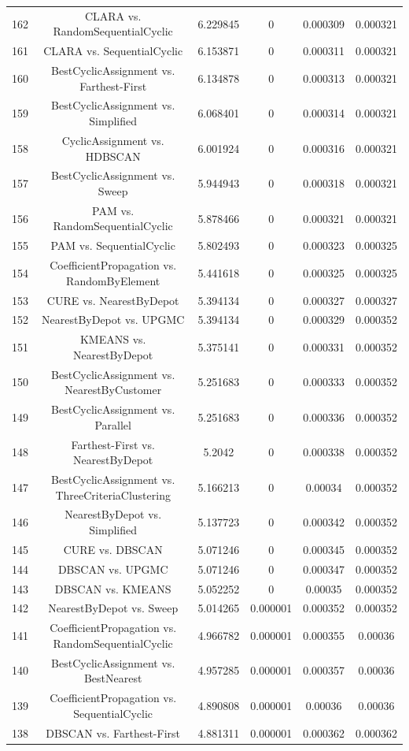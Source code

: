 \documentclass[a4paper,10pt]{article}
\begin{document}
\begin{landscape}
\begin{table}[!htp]
\begin{tabular}{cccccc}
162&CLARA vs. RandomSequentialCyclic&6.229845&0&0.000309&0.000321\\
161&CLARA vs. SequentialCyclic&6.153871&0&0.000311&0.000321\\
160&BestCyclicAssignment vs. Farthest-First&6.134878&0&0.000313&0.000321\\
159&BestCyclicAssignment vs. Simplified&6.068401&0&0.000314&0.000321\\
158&CyclicAssignment vs. HDBSCAN&6.001924&0&0.000316&0.000321\\
157&BestCyclicAssignment vs. Sweep&5.944943&0&0.000318&0.000321\\
156&PAM vs. RandomSequentialCyclic&5.878466&0&0.000321&0.000321\\
155&PAM vs. SequentialCyclic&5.802493&0&0.000323&0.000325\\
154&CoefficientPropagation vs. RandomByElement&5.441618&0&0.000325&0.000325\\
153&CURE vs. NearestByDepot&5.394134&0&0.000327&0.000327\\
152&NearestByDepot vs. UPGMC&5.394134&0&0.000329&0.000352\\
151&KMEANS vs. NearestByDepot&5.375141&0&0.000331&0.000352\\
150&BestCyclicAssignment vs. NearestByCustomer&5.251683&0&0.000333&0.000352\\
149&BestCyclicAssignment vs. Parallel&5.251683&0&0.000336&0.000352\\
148&Farthest-First vs. NearestByDepot&5.2042&0&0.000338&0.000352\\
147&BestCyclicAssignment vs. ThreeCriteriaClustering&5.166213&0&0.00034&0.000352\\
146&NearestByDepot vs. Simplified&5.137723&0&0.000342&0.000352\\
145&CURE vs. DBSCAN&5.071246&0&0.000345&0.000352\\
144&DBSCAN vs. UPGMC&5.071246&0&0.000347&0.000352\\
143&DBSCAN vs. KMEANS&5.052252&0&0.00035&0.000352\\
142&NearestByDepot vs. Sweep&5.014265&0.000001&0.000352&0.000352\\
141&CoefficientPropagation vs. RandomSequentialCyclic&4.966782&0.000001&0.000355&0.00036\\
140&BestCyclicAssignment vs. BestNearest&4.957285&0.000001&0.000357&0.00036\\
139&CoefficientPropagation vs. SequentialCyclic&4.890808&0.000001&0.00036&0.00036\\
138&DBSCAN vs. Farthest-First&4.881311&0.000001&0.000362&0.000362\\

\end{tabular}
\end{table}
\end{landscape}
\end{document}
